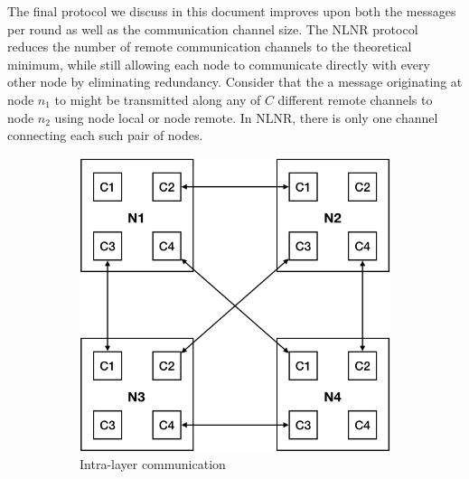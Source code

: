 \documentclass{report}
\begin{document}
The final protocol we discuss in this document improves upon both the messages per round as well as the communication channel size.
The NLNR protocol reduces the number of remote communication channels to the theoretical minimum, while still allowing each node to communicate directly with every other node by eliminating redundancy.
Consider that the a message originating at node $n_1$ to might be transmitted along any of $C$ different remote channels to node $n_2$ using node local or node remote.
In NLNR, there is only one channel connecting each such pair of nodes. 

\begin{figure}
	\begin{center}
		\begin{subfigure}{0.45\linewidth}
			\centerline{\includegraphics[width=1.0\columnwidth]{intra_layer_nlnr}}
			\caption{Intra-layer communication \label{fig:intra_exchange}}
		\end{subfigure}%
		\hspace{1em}%
		\begin{subfigure}{0.49\linewidth}

\end{subfigure}
\end{center}
\end{figure}
\end{document}
